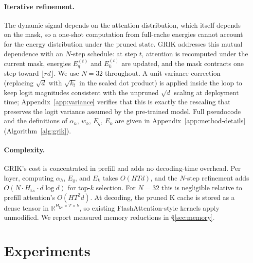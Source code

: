 \documentclass{article}
\begin{document}
\paragraph{Iterative refinement.}
The dynamic signal depends on the attention distribution, which itself depends on the mask, so a one-shot computation from full-cache energies cannot account for the energy distribution under the pruned state. GRIK addresses this mutual dependence with an $N$-step schedule: at step $t$, attention is recomputed under the current mask, energies $E_q^{(t)}$ and $E_k^{(t)}$ are updated, and the mask contracts one step toward $\lfloor rd \rfloor$. We use $N=32$ throughout. A unit-variance correction (replacing $\sqrt{d}$ with $\sqrt{k_t}$ in the scaled dot product) is applied inside the loop to keep logit magnitudes consistent with the unpruned $\sqrt{d}$ scaling at deployment time; Appendix~\ref{app:variance} verifies that this is exactly the rescaling that preserves the logit variance assumed by the pre-trained model. Full pseudocode and the definitions of $\alpha_h$, $w_k$, $E_q$, $E_k$ are given in Appendix~\ref{app:method-details} (Algorithm~\ref{alg:grik}).
 
\paragraph{Complexity.}
GRIK's cost is concentrated in prefill and adds no decoding-time overhead. Per layer, computing $\alpha_h$, $E_q$, and $E_k$ takes $O(HTd)$, and the $N$-step refinement adds $O(N \cdot H_{\mathrm{kv}} \cdot d \log d)$ for top-$k$ selection. For $N=32$ this is negligible relative to prefill attention's $O(HT^2d)$. At decoding, the pruned K cache is stored as a dense tensor in $\mathbb{R}^{H_{\mathrm{kv}} \times T \times k}$, so existing FlashAttention-style kernels apply unmodified. We report measured memory reductions in \S\ref{sec:memory}.
 
 
 
 
 
 
\section{Experiments}
\label{sec:experiments}
 
\end{document}

